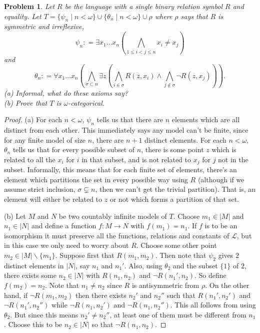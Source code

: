 \documentclass{article}
\newtheorem{problem}{Problem}
\begin{document}
\begin{problem}
Let $R$ be the language with a single binary relation symbol $R$ and equality. Let $T = \{\psi_n \mid n < \omega\} \cup \{\theta_n \mid n < \omega\} \cup \rho$ where $\rho$ says that $R$ is symmetric and irreflexive,
\[
\psi_n \mathrel{\mathop:}= \exists x_1 \dots x_n \left ( \bigwedge_{1 \leq i < j \leq n} x_i \neq x_j \right )
\]
and
\[
\theta_n \mathrel{\mathop:}= \forall x_1 \dots x_n \left ( \bigwedge_{\sigma \subset n} \exists z \left ( \bigwedge_{i \in \sigma} R(z, x_i) \wedge \bigwedge_{j \notin \sigma} \neg R(z, x_j) \right ) \right ).
\]
(a) Informal, what do these axioms say?\\
(b) Prove that $T$ is $\omega$-categorical.
\end{problem}
\begin{proof}
(a) For each $n < \omega$, $\psi_n$ tells us that there are $n$ elements which are all distinct from each other. This immediately says any model can't be finite, since for any finite model of size $n$, there are $n+1$ distinct elements. For each $n < \omega$, $\theta_n$ tells us that for every possible subset of $n$, there is some point $z$ which is related to all the $x_i$ for $i$ in that subset, and is not related to $x_j$ for $j$ not in the subset. Informally, this means that for each finite set of elements, there's an element which partitions the set in every possible way using $R$ (although if we assume strict inclusion, $\sigma \subsetneq n$, then we can't get the trivial partition). That is, an element will either be related to $z$ or not which forms a partition of that set.

(b) Let $M$ and $N$ be two countably infinite models of $T$. Choose $m_1 \in |M|$ and $n_1 \in |N|$ and define a function $f : M \to N$ with $f(m_1) = n_1$. If $f$ is to be an isomorphism it must preserve all the functions, relations and constants of $\mathcal{L}$, but in this case we only need to worry about $R$. Choose some other point $m_2 \in |M| \backslash \{m_1\}$. Suppose first that $R(m_1, m_2)$. Then note that $\psi_2$ gives $2$ distinct elements in $|N|$, say $n_1$ and $n_1'$. Also, using $\theta_2$ and the subset $\{1\}$ of $2$, there exists some $n_2 \in |N|$ with $R(n_1, n_2)$ and $\neg R(n_1', n_2)$. So define $f(m_2) = n_2$. Note that $n_1 \neq n_2$ since $R$ is antisymmetric from $\rho$. On the other hand, if $\neg R(m_1, m_2)$ then there exists $n_2'$ and $n_2''$ such that $R(n_1', n_2')$ and $\neg R(n_1', n_2'')$ while $\neg R(n_1, n_2')$ and $\neg R(n_1, n_2'')$. This all follows from using $\theta_2$. But since this means $n_2' \neq n_2''$, at least one of them must be different from $n_1$. Choose this to be $n_2 \in |N|$ so that $\neg R(n_1, n_2)$.


\end{proof}
\end{document}
